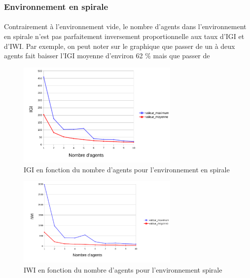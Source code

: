 \documentclass{article}
\begin{document}
        \subsubsection{Environnement en spirale}
        \paragraph{} Contrairement à l'environnement vide, le nombre d'agents dans l'environnement en spirale n'est pas parfaitement inversement proportionnelle aux taux d'IGI et d'IWI.
        Par exemple, on peut noter sur le graphique que passer de un à deux agents fait baisser l'IGI moyenne d'environ 62 \% mais que passer de 
            \begin{figure}[!h]
                \begin{center}
                    \includegraphics[width = 0.7\textwidth]{graphes pdf/variance tortues IGI spirale.pdf}
                    \caption{IGI en fonction du nombre d'agents pour l'environnement en spirale}
                \end{center}
            \end{figure}
            \begin{figure}[!h]
                \begin{center}
                    \includegraphics[width = 0.7\textwidth]{graphes pdf/variance tortues IWI spirale.pdf}
                    \caption{IWI en fonction du nombre d'agents pour l'environnement spirale}
                \end{center}
            \end{figure}
            \newpage
\end{document}
